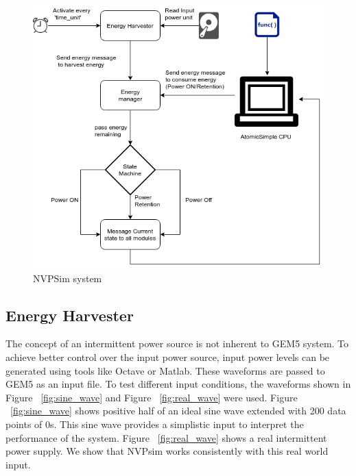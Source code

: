 \documentclass[conference]{IEEEtran}
\begin{document}
\begin{figure}[htbp]
\centerline{\includegraphics[scale=0.4]{nvpsim.png}}
\caption{NVPSim system}
\label{fig:nvpsim}
\end{figure}

\subsection{Energy Harvester}
The concept of an intermittent power source is not inherent to GEM5 system. To achieve better control over the input power source, input power levels can be generated using tools like Octave or Matlab. These waveforms are passed to GEM5 as an input file. To test different input conditions, the waveforms shown in Figure ~\ref{fig:sine_wave} and Figure ~\ref{fig:real_wave} were used. Figure ~\ref{fig:sine_wave} shows positive half of an ideal sine wave extended with 200 data points of 0s. This sine wave provides a simplistic input to interpret the performance of the system. Figure ~\ref{fig:real_wave} shows a real intermittent power supply. We show that NVPsim works consistently with this real world input. 
\end{document}
